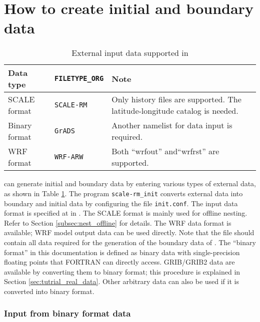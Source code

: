 \section{How to create initial and boundary data} \label{sec:adv_datainput}

\begin{table}[tbh]
\begin{center}
\caption{External input data supported in \scalelib}
\begin{tabularx}{150mm}{l|l|X} \hline
 \rowcolor[gray]{0.9} Data type   & \verb|FILETYPE_ORG|  & Note \\ \hline
 SCALE format   & \verb|SCALE-RM|     & Only history files are supported. The latitude-longitude catalog is needed. \\ \hline
 Binary format  & \verb|GrADS|        & Another namelist for data input is required.    \\ \hline
 WRF format     & \verb|WRF-ARW|      & Both ``wrfout''  and``wrfrst'' are supported.\\ \hline
\end{tabularx}
\label{tab:inputdata_format}
\end{center}
\end{table}

\scalerm can generate initial and boundary data by entering various types of external data, as shown in Table \ref{tab:inputdata_format}. The program \verb|scale-rm_init| converts external data into boundary and initial data by configuring the file \verb|init.conf|. The input data format is specified at  in . The SCALE format is mainly used for offline nesting. Refer to Section \ref{subsec:nest_offline} for details. The WRF data format is available; WRF model output data can be used directly. Note that the file should contain all data required for the generation of the boundary data of \scalerm. The ``binary format'' in this documentation is defined as binary data with single-precision floating points that FORTRAN can directly access. GRIB/GRIB2 data are available by converting them to binary format; this procedure is explained in Section \ref{sec:tutrial_real_data}. Other arbitrary data can also be used if it is converted into binary format.

\subsubsection{Input from binary format data} \label{sec:datainput_grads}

